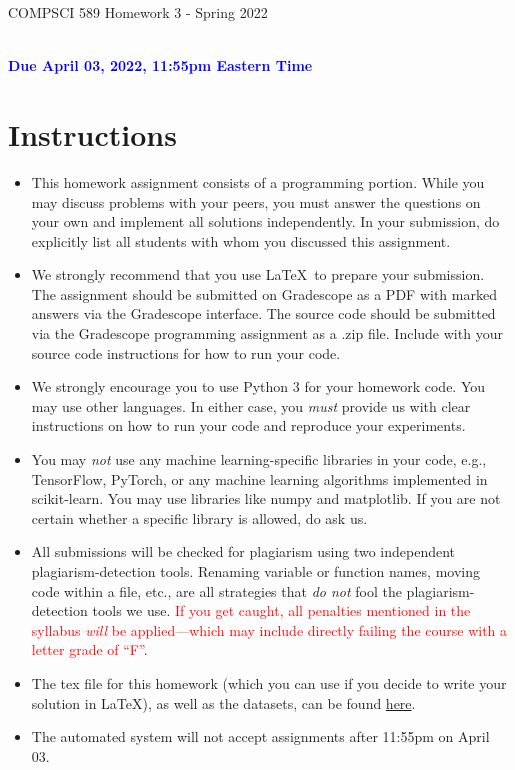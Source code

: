 \documentclass[letterpaper]{article}
\newcommand{\HIGHLIGHT}[1]{\textcolor{blue}{\textbf{#1}}}
\begin{document}
\newpage
\begin{center}
    \begin{Large}
    COMPSCI 589 Homework 3 - Spring 2022
    \end{Large}
    \\
    \HIGHLIGHT{Due April 03, 2022, 11:55pm Eastern Time}
\end{center}



\vspace{0.25in}
\section{Instructions}

\begin{itemize}
    \item This homework assignment consists of a programming portion. While you may discuss problems with your peers, you must answer the questions on your own and implement all solutions independently. In your submission, do explicitly list all students with whom you discussed this assignment. 
    \item We strongly recommend that you use \LaTeX~to prepare your submission. The assignment should be submitted on Gradescope as a PDF with marked answers via the Gradescope interface. The source code should be submitted via the Gradescope programming assignment as a .zip file. Include with your source code instructions for how to run your code. 
    \item We strongly encourage you to use Python 3 for your homework code. You may use other languages. In either case, you \textit{must} provide us with clear instructions on how to run your code and reproduce your experiments. 
    \item You may \textit{not} use any machine learning-specific libraries in your code, e.g., TensorFlow, PyTorch, or any machine learning algorithms implemented in scikit-learn. You may use libraries like numpy and matplotlib. If you are not certain whether a specific library is allowed, do ask us.
    \item All submissions will be checked for plagiarism using two independent plagiarism-detection tools. Renaming variable or function names, moving code within a file, etc., are all strategies that \textit{do not} fool the plagiarism-detection tools we use. \textcolor{red}{If you get caught, all penalties mentioned in the syllabus \textit{will} be applied---which may include directly failing the course with a letter grade of ``F''}.
    \item The tex file for this homework (which you can use if you decide to write your solution in \LaTeX), as well as the datasets, can be found \href{https://people.cs.umass.edu/~bsilva/courses/CMPSCI_589/Spring2022/homeworks/hw3.zip}{here}.
    \item The automated system will not accept assignments after 11:55pm on April 03. 
\end{itemize}
\end{document}
